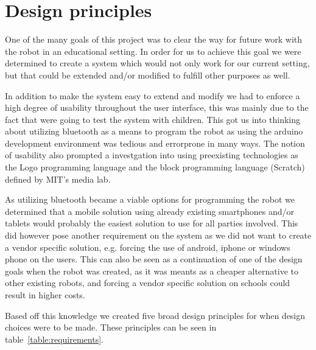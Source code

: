 \chapter{Design principles}\label{ch:principles}
One of the many goals of this project was to clear the way for future work with the \chirp robot in an educational setting. In order for us to achieve this goal we were determined to create a system which would not only work for our current setting, but that could be extended and/or modified to fulfill other purposes as well.

\bigskip\noindent
In addition to make the system easy to extend and modify we had to enforce a high degree of usability throughout the user interface, this was mainly due to the fact that were going to test the system with children. 
This got us into thinking about utilizing bluetooth as a means to program the robot as using the arduino development environment was tedious and errorprone in many ways. The notion of usability also prompted a investgation into using preexisting technologies as the Logo programming language and the block programming language (Scratch) defined by MIT's media lab. 

\bigskip\noindent
As utilizing bluetooth became a viable options for programming the robot we determined that a mobile solution using already existing smartphones and/or tablets would probably the easiest solution to use for all parties involved. This did however pose another requirement on the system as we did not want to create a vendor specific solution, e.g. forcing the use of android, iphone or windows phone on the users. 
This can also be seen as a continuation of one of the design goals when the \chirp robot was created, as it was meants as a cheaper alternative to other existing robots, and forcing a vendor specific solution on schools could result in higher costs.

\bigskip\noindent
Based off this knowledge we created five broad design principles for when design choices were to be made. These principles can be seen in table~\ref{table:requirements}.
